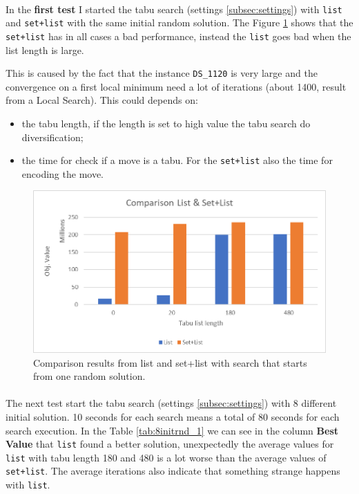 	
	
	\paragraph*{}
	In the \textbf{first test} I started the tabu search (settings \ref{subsec:settings}) with \verb|list| and \verb|set+list| with the same initial random solution. The Figure \ref{fig:oneinitrnd} shows that the \verb|set+list| has in all cases a bad performance, instead the \verb|list| goes bad when the list length is large.
	
	This is caused by the fact that the instance \verb|DS_1120| is very large and the convergence on a first local minimum need a lot of iterations (about 1400, result from a Local Search). This could depends on:
	\begin{itemize}
		\item the tabu length, if the length is set to high value the tabu search do diversification;
		\item the time for check if a move is a tabu. For the \verb|set+list| also the time for encoding the move.
	\end{itemize} 
	
	\begin{figure}
		\centering
		\includegraphics[width=\linewidth]{img/OneInitRnd}
		\caption{Comparison results from list and set+list with search that starts from one random solution.}
		\label{fig:oneinitrnd}
	\end{figure}
	
	
	\paragraph*{}
	The next test start the tabu search (settings \ref{subsec:settings}) with 8 different initial solution. 10 seconds for each search means a total of 80 seconds for each search execution. In the Table \ref{tab:8initrnd_1} we can see in the column \textbf{Best Value} that \verb|list| found a better solution, unexpectedly the average values for \verb|list| with tabu length 180 and 480 is a lot worse than the average values of \verb|set+list|. The average iterations also indicate that something strange happens with \verb|list|. 
	
